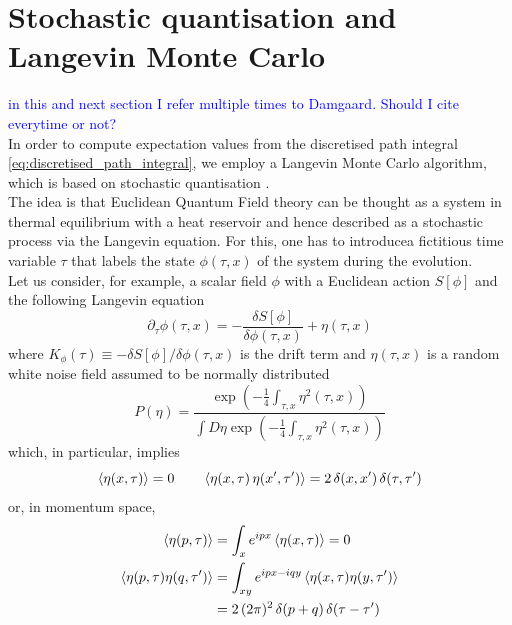 \section{Stochastic quantisation and Langevin Monte Carlo}
\textcolor{blue}{in this and next section I refer multiple times to Damgaard. Should I cite everytime or not?}\\ 
In order to compute expectation values from the discretised path integral \eqref{eq:discretised_path_integral}, we employ a Langevin Monte Carlo algorithm, which is based on stochastic quantisation \cite{ParisiWu, Damgaard1987StochasticQuantization}. \\
The idea is that Euclidean Quantum Field theory can be thought as a system in thermal equilibrium with a heat reservoir and hence described as a stochastic process via the Langevin equation. For this, one has to introducea fictitious time variable $\tau$ that labels the state $\phi(\tau, x)$ of the system 
during the evolution. \\
Let us consider, for example, a scalar field $\phi$ with a Euclidean action $S[\phi]$ and the following Langevin equation
\begin{equation}
    \partial_\tau \phi(\tau, x) = - \frac{\delta S[\phi]}{\delta \phi (\tau, x)} + \eta (\tau, x)
    \label{eq:Langevin_scalar_full}
\end{equation}
where $K_{\phi}(\tau) \equiv -\delta S[\phi]/\delta \phi (\tau, x)$ is the drift term and $\eta (\tau, x)$ is a random white noise field assumed to be normally distributed
\begin{equation*}
    P(\eta) = \frac{\exp\left(-\frac{1}{4}\int_{\tau,x} \eta^2(\tau, x)\right)}{\int D\eta \exp\left(-\frac{1}{4}\int_{\tau,x} \eta^2(\tau,x)\right)}
\end{equation*} 
which, in particular, implies
\begin{equation}
    \left\langle \eta(x,\tau) \right\rangle = 0 \qquad \left\langle \eta(x,\tau) \, \eta(x',\tau') \right\rangle = 2 \, \delta(x, x') \, \delta (\tau, \tau')
    \label{eq:white_noise_definition}
\end{equation}
or, in momentum space,
\begin{equation}
    \begin{aligned}
        \left\langle \eta(p,\tau) \right\rangle &= \int_x e^{ipx} \left\langle \eta(x,\tau) \right\rangle = 0 \\
        \left\langle \eta(p,\tau)\eta(q,\tau') \right\rangle &= \int_{xy} e^{ipx - iqy} \left\langle \eta(x,\tau)\eta(y,\tau') \right\rangle \\
        &= 2 \, (2\pi)^2 \, \delta(p + q) \, \delta(\tau - \tau')
    \end{aligned}
    \label{eq:white_noise_definition_momentum}
\end{equation}
